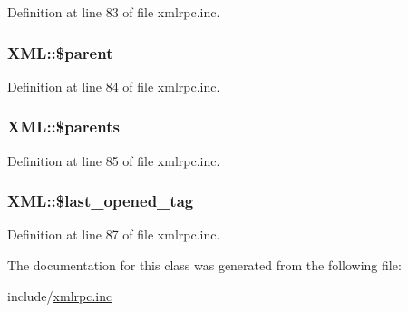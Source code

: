 Definition at line 83 of file xmlrpc.inc.\hypertarget{classXML_fa51193c2f0b317f817fa3efa8722227}{
\subsubsection{\setlength{\rightskip}{0pt plus 5cm}XML::\$parent}}
\label{classXML_fa51193c2f0b317f817fa3efa8722227}




Definition at line 84 of file xmlrpc.inc.\hypertarget{classXML_c10be009a77c59e80ce5562d4dd35532}{
\subsubsection{\setlength{\rightskip}{0pt plus 5cm}XML::\$parents}}
\label{classXML_c10be009a77c59e80ce5562d4dd35532}




Definition at line 85 of file xmlrpc.inc.\hypertarget{classXML_60e7e74df6643f50e0c6ea8252554b3d}{
\subsubsection{\setlength{\rightskip}{0pt plus 5cm}XML::\$last\_\-opened\_\-tag}}
\label{classXML_60e7e74df6643f50e0c6ea8252554b3d}




Definition at line 87 of file xmlrpc.inc.

The documentation for this class was generated from the following file:\begin{CompactItemize}
\item 
include/\hyperlink{xmlrpc_8inc}{xmlrpc.inc}\end{CompactItemize}
